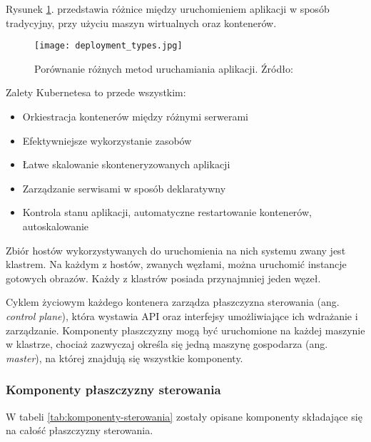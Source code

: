 Rysunek \ref{fig:deployment-types}. przedstawia różnice między uruchomieniem aplikacji w sposób 
tradycyjny, przy użyciu maszyn wirtualnych oraz kontenerów.

\begin{figure}[h]
    \centering
    \texttt{[image: deployment\_types.jpg]}
    \caption{Porównanie różnych metod uruchamiania aplikacji. Źródło: \cite{kubernetes2022}}
    \label{fig:deployment-types}
\end{figure}

Zalety Kubernetesa to przede wszystkim:

\begin{itemize} %
    \item Orkiestracja kontenerów między różnymi serwerami
    \item Efektywniejsze wykorzystanie zasobów
    \item Łatwe skalowanie skonteneryzowanych aplikacji 
    \item Zarządzanie serwisami w sposób deklaratywny
    \item Kontrola stanu aplikacji, automatyczne restartowanie kontenerów, 
    autoskalowanie
\end{itemize}

Zbiór hostów wykorzystywanych do uruchomienia na nich systemu zwany jest klastrem. Na 
każdym z hostów, zwanych węzłami, można uruchomić instancje gotowych obrazów. Każdy 
z klastrów posiada przynajmniej jeden węzeł.

Cyklem życiowym każdego kontenera zarządza płaszczyzna sterowania (ang. \textit{control 
plane}), która wystawia API oraz interfejsy umożliwiające ich wdrażanie i zarządzanie. 
Komponenty płaszczyzny mogą być uruchomione na każdej maszynie w klastrze, chociaż 
zazwyczaj określa się jedną maszynę gospodarza (ang. \textit{master}), na której znajdują się 
wszystkie komponenty.

\subsubsection{Komponenty płaszczyzny sterowania}

W tabeli \ref{tab:komponenty-sterowania} zostały opisane komponenty składające się na całość płaszczyzny 
sterowania.

